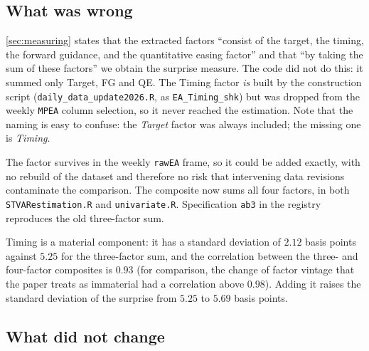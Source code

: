 {\color{blue}

\subsection*{What was wrong}

\autoref{sec:measuring} states that the extracted factors ``consist of the target, the timing, the
forward guidance, and the quantitative easing factor'' and that ``by taking the sum of these
factors'' we obtain the surprise measure. The code did not do this: it summed only Target, FG and
QE. The Timing factor \emph{is} built by the construction script
(\texttt{daily\_data\_update2026.R}, as \texttt{EA\_Timing\_shk}) but was dropped from the weekly
\texttt{MPEA} column selection, so it never reached the estimation. Note that the naming is easy to
confuse: the \emph{Target} factor was always included; the missing one is \emph{Timing}.

The factor survives in the weekly \texttt{rawEA} frame, so it could be added exactly, with no
rebuild of the dataset and therefore no risk that intervening data revisions contaminate the
comparison. The composite now sums all four factors, in both
\texttt{STVARestimation.R} and \texttt{univariate.R}. Specification \texttt{ab3} in the registry
reproduces the old three-factor sum.

Timing is a material component: it has a standard deviation of $2.12$ basis points against $5.25$
for the three-factor sum, and the correlation between the three- and four-factor composites is
$0.93$ (for comparison, the change of factor vintage that the paper treats as immaterial had a
correlation above $0.98$). Adding it raises the standard deviation of the surprise from $5.25$ to
$5.69$ basis points.

\subsection*{What did not change}

}
